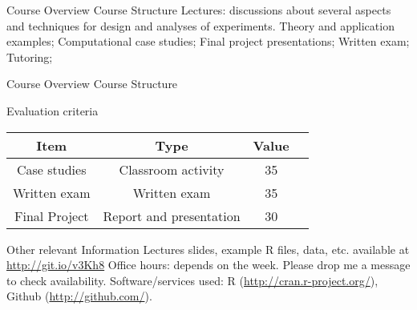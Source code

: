 \documentclass[t]{beamer}
\begin{document}

\begin{ftst}
{Course Overview}
{Course Structure}
\bitems Lectures: discussions about several aspects and techniques for design and analyses of experiments. Theory and application examples;
\spitem Computational case studies; 
\spitem Final project presentations;
\spitem Written exam;
\spitem Tutoring;
\eitem
\end{ftst}


\begin{ftst}
{Course Overview}
{Course Structure}
\begin{block}{Evaluation criteria}
	\begin{center}
		\small
		\begin{tabular}{cccc} \hline
			\textbf{Item}	& \textbf{Type}	&Value\\
			\hline
			Case studies		& Classroom activity		&35\\
			Written exam		& Written exam	&35\\
			Final Project		& Report and presentation		&30\\
			\hline
		\end{tabular}
	\end{center}
\end{block}

\begin{block}{Other relevant Information}
	\bitems Lectures slides, example R files, data, etc. available at \\
	{\small \url{http://git.io/v3Kh8}}
	\spitem Office hours: depends on the week. Please drop me a message to check availability.
	\spitem Software/services used: R ({\scriptsize\url{http://cran.r-project.org/}}),\\Github ({\scriptsize\url{http://github.com/}}).
	\eitem
\end{block}
\end{ftst}

\end{document}
